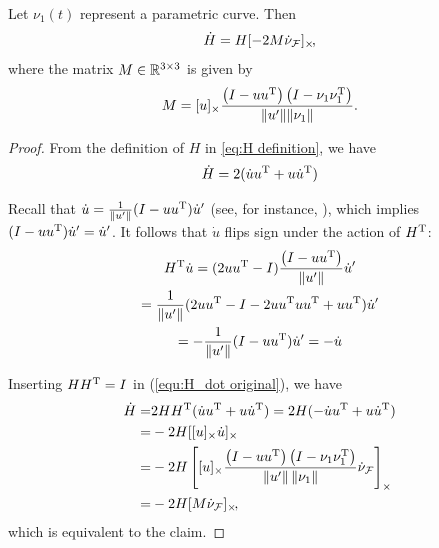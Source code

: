 \documentclass[10pt,twocolumn,twoside]{IEEEtran}
\begin{document}
\begin{proposition}\label{prop:Hderivitive}
  Let $\nu_1(t)$ represent a parametric curve. Then
  \begin{equation}
    \dot{H}=H[-2M\dot{\nu}_{\mathcal{F}}]_{\times}\!,
  \end{equation}
  where the matrix $M\in\mathbb{R}^{3\times3}{}$ is given by
  \begin{equation}
    M=[u]_{\times}  \frac{ \left( I - u u^\mathrm{T} \right) \left( I- \nu_1 \nu_1^\mathrm{T} \right)} {\lVert u'\rVert \lVert\nu_1\rVert}.
  \end{equation}
\end{proposition}
\begin{proof}
    From the definition of $H$ in \eqref{eq:H definition}, we have
    \begin{equation} \label{equ:H_dot original}
      \dot H =   2(\dot u u^\mathrm{T} + u \dot u^\mathrm{T})
    \end{equation}

    Recall that $\dot{u}=\frac{1}{\lVert u'\rVert}(I-uu^\mathrm{T})\dot{u}'$ (see, for instance, \cite{Tron:Arxiv14}), which implies $(I-uu^\mathrm{T})\dot{u}'=\dot{u}'$. It follows that $\dot{u}$ flips sign under the action of $H^\mathrm{T}$:
    \begin{multline}
      H^\mathrm{T} \dot u = (2u u^\mathrm{T}-I)\frac{ \left( I - u u^\mathrm{T} \right) } {\left\|u'\right\|} \dot u' \\
      =\frac{1}{\lVert u'\rVert} (2u u^\mathrm{T}-I-2u u^\mathrm{T} u u^\mathrm{T}+u u^\mathrm{T})\dot{u}'\\
      = -\frac{1}{\lVert u'\rVert} (I-u u^\mathrm{T})\dot u'
      = -\dot u
    \end{multline}

    Inserting $HH^\mathrm{T}=I$ in (\ref{equ:H_dot original}), we have
    \begin{equation}
      \begin{split}
        \dot H =  &  2H H^\mathrm{T}(\dot u u^\mathrm{T} + u \dot u^\mathrm{T})
        =  2 H (-\dot u u^\mathrm{T} + u \dot u^\mathrm{T})\\
        =  &  -2H [[u]_{\times} \dot u]_{\times} \\
        = &  -2 H \left[ [u]_{\times}  \frac{ \left( I - u u^\mathrm{T} \right) \left( I- \nu_1 \nu_1^\mathrm{T} \right)} {\left\|u'\right\| \left\|\nu_1\right\|} \dot{\nu}_{\mathcal{F}}\right]_{\times}\\
        = & -2 H [M \dot{\nu}_{\mathcal{F}}]_{\times}\!,
      \end{split}
    \end{equation}
    which is equivalent to the claim.
  \end{proof}
\end{document}
